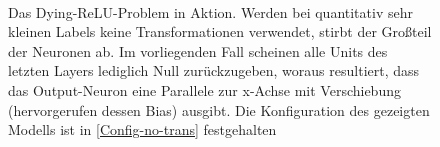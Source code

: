 \begin{figure}
	\centering
	 \\
	\label{Problems-in-action}
	\caption{Das Dying-ReLU-Problem in Aktion. Werden bei quantitativ sehr kleinen Labels keine Transformationen verwendet, stirbt der Großteil der Neuronen ab. Im vorliegenden Fall scheinen alle Units des letzten Layers lediglich Null zurückzugeben, woraus resultiert, dass das Output-Neuron eine Parallele zur x-Achse mit Verschiebung (hervorgerufen dessen Bias) ausgibt. Die Konfiguration des gezeigten Modells ist in \textsf{\autoref{Config-no-trans}} festgehalten}
\end{figure}
